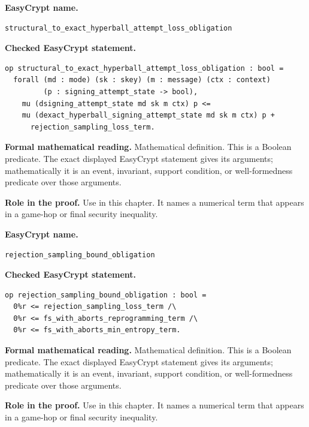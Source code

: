 \begin{formaldefinition}
\noindent\textbf{EasyCrypt name.}
\begin{lstlisting}[language=EasyCrypt,basicstyle=\ttfamily\scriptsize]
structural_to_exact_hyperball_attempt_loss_obligation
\end{lstlisting}
\noindent\textbf{Checked EasyCrypt statement.}
\begin{lstlisting}[language=EasyCrypt,basicstyle=\ttfamily\scriptsize]
op structural_to_exact_hyperball_attempt_loss_obligation : bool =
  forall (md : mode) (sk : skey) (m : message) (ctx : context)
         (p : signing_attempt_state -> bool),
    mu (dsigning_attempt_state md sk m ctx) p <=
    mu (dexact_hyperball_signing_attempt_state md sk m ctx) p +
      rejection_sampling_loss_term.
\end{lstlisting}
\noindent\textbf{Formal mathematical reading.}
Mathematical definition. This is a Boolean predicate.  The exact displayed EasyCrypt statement gives its arguments; mathematically it is an event, invariant, support condition, or well-formedness predicate over those arguments.

\noindent\textbf{Role in the proof.}
Use in this chapter. It names a numerical term that appears in a game-hop or final security inequality.

\end{formaldefinition}

\begin{formaldefinition}
\noindent\textbf{EasyCrypt name.}
\begin{lstlisting}[language=EasyCrypt,basicstyle=\ttfamily\scriptsize]
rejection_sampling_bound_obligation
\end{lstlisting}
\noindent\textbf{Checked EasyCrypt statement.}
\begin{lstlisting}[language=EasyCrypt,basicstyle=\ttfamily\scriptsize]
op rejection_sampling_bound_obligation : bool =
  0%r <= rejection_sampling_loss_term /\
  0%r <= fs_with_aborts_reprogramming_term /\
  0%r <= fs_with_aborts_min_entropy_term.
\end{lstlisting}
\noindent\textbf{Formal mathematical reading.}
Mathematical definition. This is a Boolean predicate.  The exact displayed EasyCrypt statement gives its arguments; mathematically it is an event, invariant, support condition, or well-formedness predicate over those arguments.

\noindent\textbf{Role in the proof.}
Use in this chapter. It names a numerical term that appears in a game-hop or final security inequality.

\end{formaldefinition}

